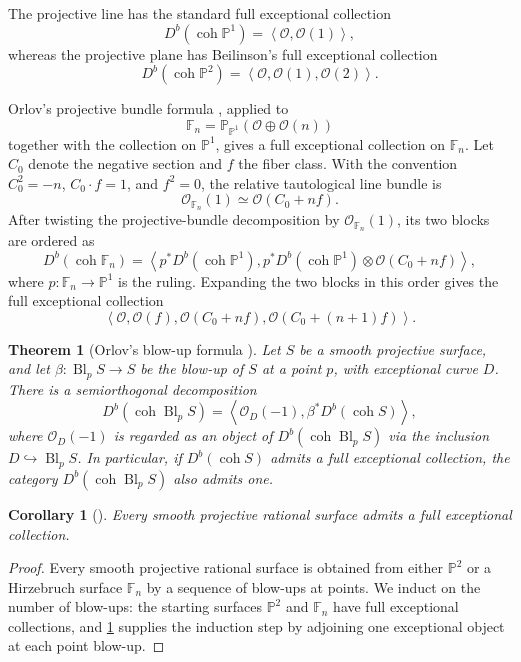 \documentclass[11pt]{article}
\theoremstyle{plain}
\newtheorem{theorem}{Theorem}[section]
\newtheorem{corollary}[corollary]{Corollary}
\theoremstyle{definition}
\theoremstyle{remark}
\newcommand{\Pp}{\mathbb P}
\newcommand{\F}{\mathbb F}
\newcommand{\Db}{D^b}
\newcommand{\coh}{\operatorname{coh}}
\newcommand{\Bl}{\operatorname{Bl}}
\newcommand{\OO}{\mathcal O}
\begin{document}
The projective line has the standard full exceptional collection
\[
\Db(\coh \Pp^1)=\left\langle \OO,\OO(1)\right\rangle,
\]
whereas the projective plane has Beilinson's full exceptional collection \cite{Beilinson1978}
\[
\Db(\coh \Pp^2)=\left\langle \OO,\OO(1),\OO(2)\right\rangle.
\]

Orlov's projective bundle formula \cite[Corollary 2.7]{Orlov1993}, applied to
\[
\F_n=\Pp_{\Pp^1}(\OO\oplus\OO(n))
\]
together with the collection on \(\Pp^1\), gives a full exceptional collection on \(\F_n\). Let \(C_0\) denote the negative section and \(f\) the fiber class. With the convention \(C_0^2=-n\), \(C_0\cdot f=1\), and \(f^2=0\), the relative tautological line bundle is
\[
\OO_{\F_n}(1)\simeq \OO(C_0+nf).
\]
After twisting the projective-bundle decomposition by
\(\OO_{\F_n}(1)\), its two blocks are ordered as
\[
\Db(\coh\F_n)
=
\left\langle
p^*\Db(\coh\Pp^1),
p^*\Db(\coh\Pp^1)\otimes\OO(C_0+nf)
\right\rangle,
\]
where \(p:\F_n\to\Pp^1\) is the ruling. Expanding the two blocks in this
order gives the full exceptional collection
\[
\left\langle
\OO,\OO(f),\OO(C_0+nf),\OO(C_0+(n+1)f)
\right\rangle .
\]

\begin{theorem}[Orlov's blow-up formula {\cite[Theorem~4.3 and Corollary~4.4]{Orlov1993}}]\label{thm:orlov-blow-up}
Let \(S\) be a smooth projective surface, and let \(\beta:\Bl_pS\to S\) be the blow-up of \(S\) at a point \(p\), with exceptional curve \(D\). There is a semiorthogonal decomposition
\[
\Db(\coh \Bl_pS)
=
\left\langle
\OO_D(-1),\beta^*\Db(\coh S)
\right\rangle,
\]
where \(\OO_D(-1)\) is regarded as an object of \(\Db(\coh \Bl_pS)\) via the inclusion \(D\hookrightarrow \Bl_pS\). In particular, if \(\Db(\coh S)\) admits a full exceptional collection, the category \(\Db(\coh \Bl_pS)\) also admits one.
\end{theorem}

\begin{corollary}[{\cite[Theorem~5.6]{HillePerling2011}}]\label{cor:rational-surface-fec}
Every smooth projective rational surface admits a full exceptional collection.
\end{corollary}

\begin{proof}
Every smooth projective rational surface is obtained from either \(\Pp^2\) or a Hirzebruch surface \(\F_n\) by a sequence of blow-ups at points. We induct on the number of blow-ups: the starting surfaces \(\Pp^2\) and \(\F_n\) have full exceptional collections, and \cref{thm:orlov-blow-up} supplies the induction step by adjoining one exceptional object at each point blow-up.
\end{proof}
\end{document}
